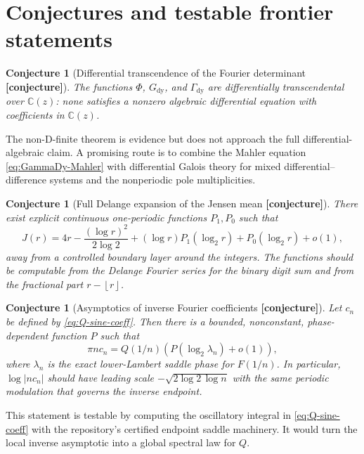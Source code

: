 \documentclass[11pt,oneside]{article}
\newtheorem{conjecture}[theorem]{Conjecture}
\theoremstyle{definition}
\theoremstyle{remark}
\newcommand{\C}{\mathbb C}
\newcommand{\smallo}{o}
\newcommand{\floor}[1]{\left\lfloor #1\right\rfloor}
\newcommand{\GammaDy}{\Gamma_{\!\mathrm{dy}}}
\newcommand{\Conj}{\textcolor{deepred}{\textbf{[conjecture]}}}
\begin{document}
\section{Conjectures and testable frontier statements}
\label{sec:conjectures}

\begin{conjecture}[Differential transcendence of the Fourier determinant \Conj]
The functions $\Phi$, $G_{\mathrm{dy}}$, and $\GammaDy$ are differentially transcendental
over $\C(z)$: none satisfies a nonzero algebraic differential equation with coefficients in
$\C(z)$.
\end{conjecture}

The non-D-finite theorem is evidence but does not approach the full differential-algebraic
claim.  A promising route is to combine the Mahler equation
\eqref{eq:GammaDy-Mahler} with differential Galois theory for mixed differential--difference
systems and the nonperiodic pole multiplicities.

\begin{conjecture}[Full Delange expansion of the Jensen mean \Conj]
There exist explicit continuous one-periodic functions $P_1,P_0$ such that
\begin{equation}
 J(r)=4r-\frac{(\log r)^2}{2\log2}
      +(\log r)P_1(\log_2r)+P_0(\log_2r)+\smallo(1),      \label{eq:J-Delange-conj}
\end{equation}
away from a controlled boundary layer around the integers.  The functions should be
computable from the Delange Fourier series for the binary digit sum and from the fractional
part $r-\floor r$.
\end{conjecture}

\begin{conjecture}[Asymptotics of inverse Fourier coefficients \Conj]
Let $c_n$ be defined by \eqref{eq:Q-sine-coeff}.  Then there is a bounded, nonconstant,
phase-dependent function $P$ such that
\begin{equation}
 \pi n c_n
 =Q(1/n)\left(P(\log_2\lambda_n)+\smallo(1)\right),      \label{eq:cn-conj}
\end{equation}
where $\lambda_n$ is the exact lower-Lambert saddle phase for $F(1/n)$.  In particular,
$\log|nc_n|$ should have leading scale
$-\sqrt{2\log2\,\log n}$ with the same periodic modulation that governs the inverse endpoint.
\end{conjecture}

This statement is testable by computing the oscillatory integral in
\eqref{eq:Q-sine-coeff} with the repository's certified endpoint saddle machinery.  It would
turn the local inverse asymptotic into a global spectral law for $Q$.
\end{document}
